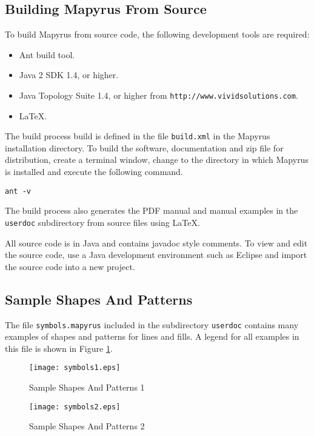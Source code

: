 \subsection{Building Mapyrus From Source}

To build Mapyrus from source code, the following development tools
are required:

\begin{itemize}
\item
Ant build tool.
\item
Java 2 SDK 1.4, or higher.
\item
Java Topology Suite 1.4, or higher from \texttt{http://www.vividsolutions.com}.
\item
\LaTeX.
\end{itemize}

The build process build is defined in the file \texttt{build.xml} in the
Mapyrus installation directory.  To build the software, documentation and zip
file for distribution, create a terminal window, change to the directory in
which Mapyrus is installed and execute the following command.

\begin{verbatim}
ant -v
\end{verbatim}

The build process also generates the PDF manual and manual examples in the
\texttt{userdoc} subdirectory from source files using \LaTeX.

All source code is in Java and contains javadoc style comments.  To view and
edit the source code, use a Java development environment such as Eclipse and
import the source code into a new project.


\subsection{Sample Shapes And Patterns}
The file \texttt{symbols.mapyrus} included in the subdirectory
\texttt{userdoc} contains many examples of shapes and patterns
for lines and fills.  A legend for all examples in this file is shown
in Figure \ref{samplesymbols}.

\begin{figure}[htb]
\label{samplesymbols}
\texttt{[image: symbols1.eps]}
\caption{Sample Shapes And Patterns 1}
\end{figure}

\begin{figure}[htb]
\texttt{[image: symbols2.eps]}
\caption{Sample Shapes And Patterns 2}
\end{figure}

